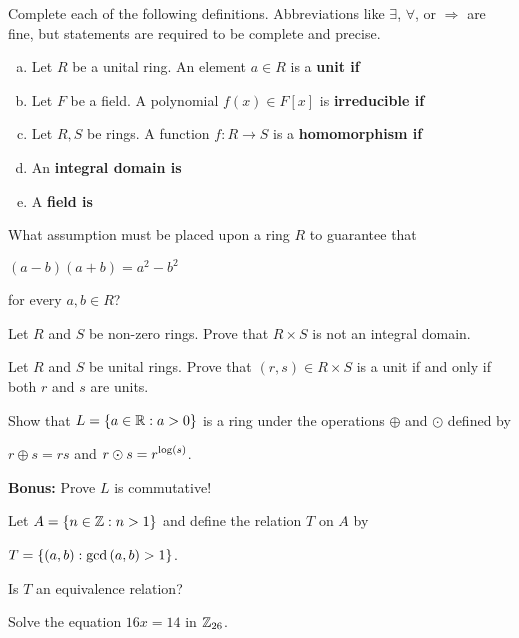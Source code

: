 \documentclass[11pt]{exam}
\begin{document}
\newpage %

%
%
%

\begin{questions}
\question[10] Complete each of the following definitions.  Abbreviations like $\exists$, $\forall$, or $\Rightarrow$ are fine, but statements are required to be complete and precise.
\begin{enumerate}[(a)]
\item Let $R$ be a unital ring.  An element $a\in R$ is a \bf unit \md if
\vfill

\item Let $F$ be a field.  A polynomial $f(x)\in F[x]$ is \bf irreducible \md if 
\vfill

\item Let $R,S$ be rings.  A function $f:R\to S$ is a \bf homomorphism \md if
\vfill

\item An \bf integral domain \md is
\vfill

\item A \bf field \md is
\vfill

\end{enumerate}
\newpage


\question[5] What assumption must be placed upon a ring $R$ to guarantee that
\begin{center}
$(a-b)(a+b) = a^2 - b^2$
\end{center}
for every $a,b\in R$?
\newpage

\question[3] Let $R$ and $S$ be non-zero rings.  Prove that $R\times S$ is not an integral domain.
\newpage

\question[5] Let $R$ and $S$ be unital rings.  Prove that $(r,s)\in R\times S$ is a unit if and only if both $r$ and $s$ are units.
\newpage

\question[5] Show that $L = \left\{a\in\mathbb{R}:a > 0\right\}$ is a ring under the operations $\oplus$ and $\odot$ defined by
\begin{center}
$r\oplus s = rs$ and $r\odot s = \displaystyle{r^{\log(s)}}$.
\end{center}
\textbf{Bonus:} Prove $L$ is commutative!
\newpage


\question[3] Let $A = \left\{n\in\mathbb{Z} : n > 1\right\}$ and define the relation $T$ on $A$ by
\begin{center}
$T = \left\{(a,b):\text{gcd}\left(a,b\right) > 1\right\}$.
\end{center}
Is $T$ an equivalence relation?
\vfill

\question[4] Solve the equation $16x = 14$ in $\mathbb{Z}_{26}$.
\vfill

\end{questions}
\end{document}
